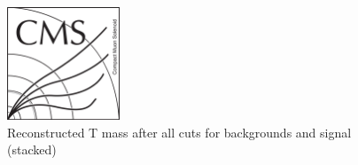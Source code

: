 \begin{figure}[!Hhtbp]
  \begin{center}
    \includegraphics[width=0.3\textwidth]{figs/CMSlogo.png}
    \caption{Reconstructed T mass after all cuts for backgrounds and signal (stacked)}
    \label{fig:M5J}
  \end{center}
\end{figure}
